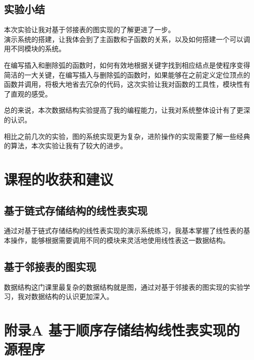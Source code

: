 \documentclass[supercite]{Experimental_Report}
\theoremstyle{definition}
\begin{document}
\subsection{实验小结}
本次实验让我对基于邻接表的图实现的了解更进了一步。\\
演示系统的搭建，让我体会到了主函数和子函数的关系，以及如何搭建一个可以调用不同模块的系统。\par
在编写插入和删除弧的函数时，如何有效地根据关键字找到相应结点是使程序变得简洁的一大关键，在编写插入与删除弧的函数时，如果能够在之前定义定位顶点的函数并调用，将极大地省去冗杂的代码，这次实验让我对函数的工具性，模块性有了直观的感受。\par
总的来说，本次数据结构实验提高了我的编程能力，让我对系统整体设计有了更深的认识。\par
相比之前几次的实验，图的系统实现更为复杂，进阶操作的实现需要了解一些经典的算法，本次实验让我有了较大的进步。
\newpage

\section{课程的收获和建议}
\subsection{基于链式存储结构的线性表实现}
通过对基于链式存储结构的线性表实现的演示系统练习，我基本掌握了线性表的基本操作，能够根据需要调用不同的模块来灵活地使用线性表这一数据结构。\par
\subsection{基于邻接表的图实现}
数据结构这门课里最复杂的数据结构就是图，通过对基于邻接表的图实现的实验学习，我对数据结构的认识更加深入。\par





\section{附录A 基于顺序存储结构线性表实现的源程序}

\noindent
\end{document}
